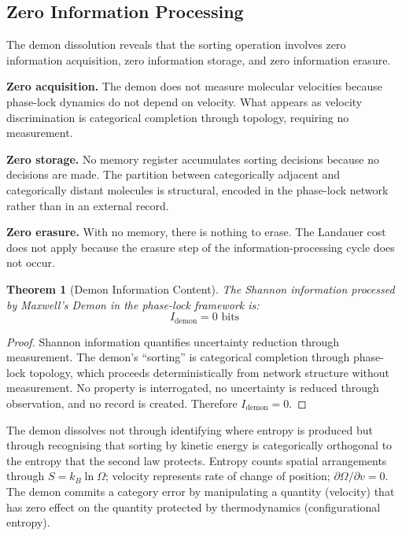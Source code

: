 \documentclass[twocolumn,10pt,a4paper]{article}
\newtheorem{theorem}{Theorem}[section]
\theoremstyle{definition}
\theoremstyle{remark}
\begin{document}
\subsection{Zero Information Processing}

The demon dissolution reveals that the sorting operation involves zero information acquisition, zero information storage, and zero information erasure.

\textbf{Zero acquisition.} The demon does not measure molecular velocities because phase-lock dynamics do not depend on velocity. What appears as velocity discrimination is categorical completion through topology, requiring no measurement.

\textbf{Zero storage.} No memory register accumulates sorting decisions because no decisions are made. The partition between categorically adjacent and categorically distant molecules is structural, encoded in the phase-lock network rather than in an external record.

\textbf{Zero erasure.} With no memory, there is nothing to erase. The Landauer cost does not apply because the erasure step of the information-processing cycle does not occur.

\begin{theorem}[Demon Information Content]
\label{thm:demon_info}
The Shannon information processed by Maxwell's Demon in the phase-lock framework is:
\begin{equation}
I_{\mathrm{demon}} = 0 \text{ bits}
\end{equation}
\end{theorem}

\begin{proof}
Shannon information quantifies uncertainty reduction through measurement. The demon's ``sorting'' is categorical completion through phase-lock topology, which proceeds deterministically from network structure without measurement. No property is interrogated, no uncertainty is reduced through observation, and no record is created. Therefore $I_{\mathrm{demon}} = 0$.
\end{proof}

The demon dissolves not through identifying where entropy is produced but through recognising that sorting by kinetic energy is categorically orthogonal to the entropy that the second law protects. Entropy counts spatial arrangements through $S = k_B \ln \Omega$; velocity represents rate of change of position; $\partial \Omega/\partial v = 0$. The demon commits a category error by manipulating a quantity (velocity) that has zero effect on the quantity protected by thermodynamics (configurational entropy).
\end{document}
